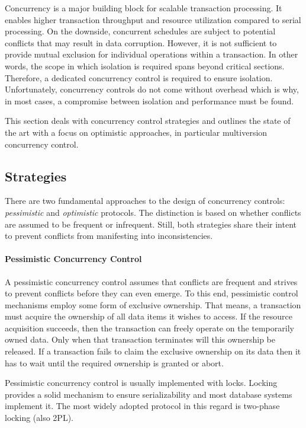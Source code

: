 Concurrency is a major building block for scalable transaction processing. It
enables higher transaction throughput and resource utilization compared to
serial processing. On the downside, concurrent schedules are subject to
potential conflicts that may result in data corruption. However, it is not
sufficient to provide mutual exclusion for individual operations within a
transaction. In other words, the scope in which isolation is required spans
beyond critical sections. Therefore, a dedicated concurrency control is required
to ensure isolation. Unfortunately, concurrency controls do not come without overhead which is why, in most cases, a compromise between isolation and performance must be found.

This section deals with concurrency control strategies and outlines the state of
the art with a focus on optimistic approaches, in particular multiversion
concurrency control.

\subsection{Strategies}

There are two fundamental approaches to the design of concurrency controls:
\emph{pessimistic} and \emph{optimistic} protocols. The distinction is based on
whether conflicts are assumed to be frequent or infrequent. Still, both
strategies share their intent to prevent conflicts from manifesting into
inconsistencies.

\paragraph{Pessimistic Concurrency Control}

A pessimistic concurrency control assumes that conflicts are frequent and
strives to prevent conflicts before they can even emerge. To this end,
pessimistic control mechanisms employ some form of exclusive ownership. That
means, a transaction must acquire the ownership of all data items it wishes to
access. If the resource acquisition succeeds, then the transaction can freely
operate on the temporarily owned data. Only when that transaction terminates
will this ownership be released. If a transaction fails to claim the exclusive
ownership on its data then it has to wait until the required ownership is
granted or abort.

Pessimistic concurrency control is usually implemented with locks. Locking
provides a solid mechanism to ensure serializability and most database systems
implement it. The most widely adopted protocol in this regard is two-phase
locking (also 2PL).

